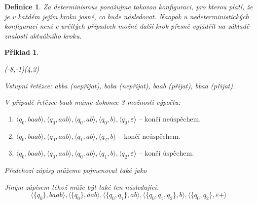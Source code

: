 \documentclass[10pt, a4paper, titlepage]{article}
\theoremstyle{note}
\newtheorem{definice}{\textbf{Definice}}
\newtheorem{priklad}{\textbf{Příklad}}
\begin{document}

\begin{definice}
Za \emph{determinismus} považujme takovou konfiguraci, pro kterou platí, že je v každém jejím kroku jasné, co bude následovat.
Naopak u \emph{nedeterministických} konfigurací není v určitých případech možné další krok přesně vyjádřit na základě znalostí aktuálního kroku.
\end{definice}

\begin{priklad}
\vspace{20px}
\begin{VCPicture}{(-8,-1)(4,2)}

\end{VCPicture}


Vstupní řetězce: \textit{abba} (nepřijat), \textit{baba} (nepřijat), \textit{baab} (přijat), \textit{bbaa} (přijat).

V případě řetězce \textit{baab} máme dokonce 3 možnosti výpočtu:
\begin{enumerate}
\item
$\langle q_{0}, baab \rangle, \langle q_{0}, aab \rangle, \langle q_{0}, ab \rangle, \langle q_{0}, b \rangle, \langle q_{0}, \varepsilon \rangle \text{ -- končí neúspěchem.}$
\item
$\langle q_{0}, baab \rangle, \langle q_{0}, aab \rangle, \langle q_{1}, ab \rangle, \langle q_{2}, b \rangle \text{ -- končí neúspěchem.}$
\item
$\langle q_{0}, baab \rangle, \langle q_{0}, aab \rangle, \langle q_{0}, ab \rangle, \langle q_{1}, b \rangle, \langle q_{2}, \varepsilon \rangle \text{ -- končí úspěchem.}$ 
\end{enumerate}
Předchozí zápisy můžeme pojmenovat také jako 

Jiným zápisem téhož může být také ten následující.
$$
\langle \lbrace q_{0} \rbrace, baab \rangle, \langle \lbrace q_{0} \rbrace, aab \rangle, \langle \lbrace q_{0}, q_{1} \rbrace, ab \rangle,
\langle \lbrace q_{0}, q_{1}, q_{2} \rbrace, b \rangle, \langle \lbrace q_{0}, q_{2} \rbrace, \varepsilon+ \rangle
$$ 
\end{priklad}
\end{document}
